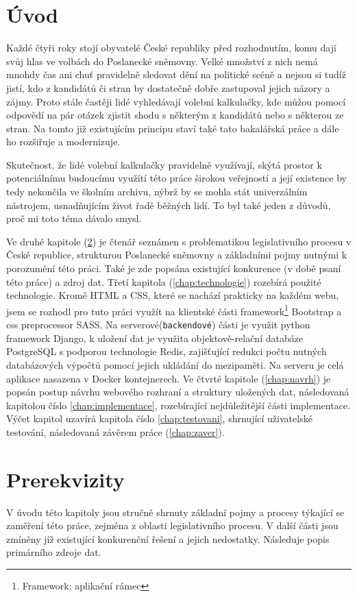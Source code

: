 
\chapter{Úvod}
Každé čtyři roky stojí obyvatelé České republiky před rozhodnutím, komu dají svůj hlas ve volbách do Poslanecké sněmovny. Velké množství z nich nemá mnohdy čas ani chuť pravidelně sledovat dění na politické scéně a nejsou si tudíž jistí, kdo z kandidátů či stran by dostatečně dobře zastupoval jejich názory a zájmy. Proto stále častěji lidé vyhledávají volební kalkulačky, kde můžou pomocí odpovědí na pár otázek zjistit shodu s některým z kandidátů nebo s některou ze stran. Na tomto již existujícím principu staví také tato bakalářská práce a dále ho rozšiřuje a modernizuje. 
\par Skutečnost, že lidé volební kalkulačky pravidelně využívají, skýtá prostor k potenciálnímu budoucímu využítí této práce širokou veřejností a její existence by tedy nekončila ve školním archivu, nýbrž by se mohla stát univerzálním nástrojem, usnadňujícím život řadě běžných lidí. To byl také jeden z důvodů, proč mi toto téma dávalo smysl.
\par Ve druhé kapitole (\ref{chap:Prerekvizity}) je čtenář seznámen s problematikou legislativního procesu v České republice, strukturou Poslanecké sněmovny a základními pojmy nutnými k porozumění této práci. Také je zde popsána existující konkurence (v době psaní této práce) a zdroj dat. Třetí kapitola (\ref{chap:technologie}) rozebírá použité technologie. Kromě HTML a CSS, které se nachází prakticky na každém webu, jsem se rozhodl pro tuto práci využít na klientské části framework\footnote{Framework: aplikační rámec} Bootstrap a css preprocessor SASS. Na serverové(\texttt{backendové}) části je využit python framework Django, k uložení dat je využita objektově-relační databáze PostgreSQL s podporou technologie Redis, zajišťující redukci počtu nutných databázových výpočtů pomocí jejich ukládání do mezipaměti. Na serveru je celá aplikace nasazena v Docker kontejnerech.  Ve čtvrté kapitole (\ref{chap:navrh}) je popsán postup návrhu webového rozhraní a struktury uložených dat, následovaná kapitolou číslo \ref{chap:implementace}, rozebírající nejdůležitější části implementace. Výčet kapitol uzavírá kapitola číslo \ref{chap:testovani}, shrnující uživatelské testování, následovaná závěrem práce (\ref{chap:zaver}).



\chapter{Prerekvizity}
\label{chap:Prerekvizity}
V úvodu této kapitoly jsou stručně shrnuty základní pojmy a procesy týkající se zaměření této práce, zejména z oblasti legislativního procesu. V další části jsou zmíněny již existující konkurenční řešení a jejich nedostatky. Následuje popis primárního zdroje dat.


